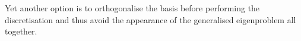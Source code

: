 Yet another option is to orthogonalise the basis before performing
the discretisation and thus avoid the appearance of the generalised
eigenproblem all together.


%




